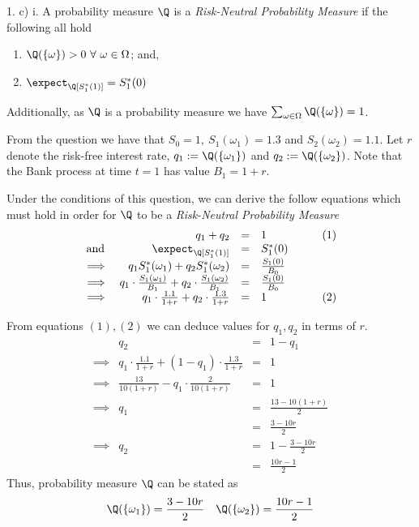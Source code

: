 \documentclass[11pt,a4paper]{article}
\begin{document}
\begin{answer}{1. c) i.}
  A probability measure $\Q$ is a \textit{Risk-Neutral Probability Measure} if the following all hold
  \begin{enumerate}
    \item $\Q(\{\omega\})>0\ \forall\ \omega\in\Omega$; and,
    \item $\expect_\Q[S_1^*(1)]=S_1^*(0)$
  \end{enumerate}
  Additionally, as $\Q$ is a probability measure we have $\sum_{\omega\in\Omega}\Q(\{\omega\})=1$.
  \par From the question we have that $S_0=1,\ S_1(\omega_1)=1.3$ and $S_2(\omega_2)=1.1$. Let $r$ denote the risk-free interest rate, $q_1:=\Q(\{\omega_1\})$ and $q_2:=\Q(\{\omega_2\})$. Note that the Bank process at time $t=1$ has value $B_1=1+r$.
  \par Under the conditions of this question, we can derive the follow equations which must hold in order for $\Q$ to be a \textit{Risk-Neutral Probability Measure}
  \[\begin{array}{rrclcl}
    &q_1+q_2&=&1&\quad&(1)\\
    \text{and }&\expect_\Q[S_1^*(1)]&=&S_1^*(0)\\
    \implies&q_1S_1^*(\omega_1)+q_2S_1^*(\omega_2)&=&\frac{S_1(0)}{B_0}\\
    \implies&q_1\cdot\frac{S_1(\omega_1)}{B_1}+q_2\cdot\frac{S_1(\omega_2)}{B_1}&=&\frac{S_1(0)}{B_0}\\
    \implies&q_1\cdot\frac{1.1}{1+r}+q_2\cdot\frac{1.3}{1+r}&=&1&&(2)\\
  \end{array}\]
  \par From equations $(1),(2)$ we can deduce values for $q_1,q_2$ in terms of $r$.
  \[\begin{array}{rrcl}
    &q_2&=&1-q_1\\
    \implies&q_1\cdot\frac{1.1}{1+r}+(1-q_1)\cdot\frac{1.3}{1+r}&=&1\\
    \implies&\frac{13}{10(1+r)}-q_1\cdot\frac2{10(1+r)}&=&1\\
    \implies&q_1&=&\frac{13-10(1+r)}2\\
    &&=&\frac{3-10r}2\\
    \implies&q_2&=&1-\frac{3-10r}2\\
    &&=&\frac{10r-1}{2}
  \end{array}\]
  Thus, probability measure $\Q$ can be stated as
  \[ \Q(\{\omega_1\})=\frac{3-10r}{2}\quad\Q(\{\omega_2\})=\frac{10r-1}2 \]

\end{answer}
\end{document}
